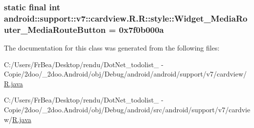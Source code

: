 \hypertarget{classandroid_1_1support_1_1v7_1_1cardview_1_1_r_1_1style_1cb8cc7f99efaec33775faaa2e777f5d}{
\subsubsection[{Widget\_\-MediaRouter\_\-MediaRouteButton}]{\setlength{\rightskip}{0pt plus 5cm}static final int android::support::v7::cardview.R.R::style::Widget\_\-MediaRouter\_\-MediaRouteButton = 0x7f0b000a}}
\label{classandroid_1_1support_1_1v7_1_1cardview_1_1_r_1_1style_1cb8cc7f99efaec33775faaa2e777f5d}




The documentation for this class was generated from the following files:\begin{CompactItemize}
\item 
C:/Users/FrBea/Desktop/rendu/DotNet\_\-todolist\_ - Copie/2doo/\_\-2doo.Android/obj/Debug/android/android/support/v7/cardview/\hyperlink{android_2support_2v7_2cardview_2_r_8java}{R.java}\item 
C:/Users/FrBea/Desktop/rendu/DotNet\_\-todolist\_ - Copie/2doo/\_\-2doo.Android/obj/Debug/android/src/android/support/v7/cardview/\hyperlink{src_2android_2support_2v7_2cardview_2_r_8java}{R.java}\end{CompactItemize}
